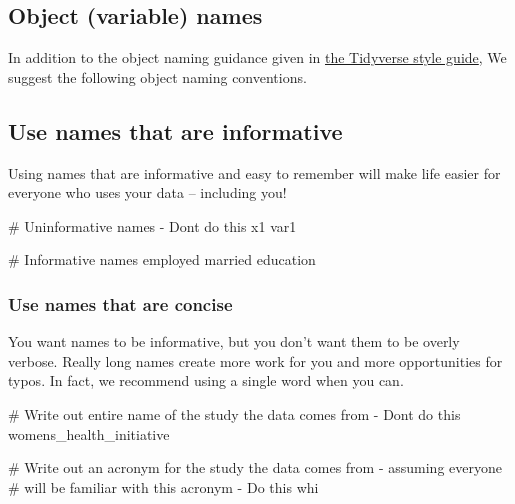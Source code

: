 \documentclass[
  letterpaper,
  DIV=11,
  numbers=noendperiod]{scrreprt}
\newenvironment{Shaded}{\begin{snugshade}}{\end{snugshade}}
\newcommand{\CommentTok}[1]{\textcolor[rgb]{0.37,0.37,0.37}{#1}}
\newcommand{\NormalTok}[1]{\textcolor[rgb]{0.00,0.23,0.31}{#1}}
\begin{document}
\subsection{Object (variable) names}\label{object-variable-names}

In addition to the object naming guidance given in
\href{https://style.tidyverse.org/files.html\#names}{the Tidyverse style
guide}, We suggest the following object naming conventions.

\subsection{Use names that are
informative}\label{use-names-that-are-informative}

Using names that are informative and easy to remember will make life
easier for everyone who uses your data -- including you!

\begin{Shaded}
\begin{Highlighting}[]
\CommentTok{\# Uninformative names {-} Don\textquotesingle{}t do this}
\NormalTok{x1}
\NormalTok{var1}

\CommentTok{\# Informative names}
\NormalTok{employed}
\NormalTok{married}
\NormalTok{education}
\end{Highlighting}
\end{Shaded}

\subsubsection{Use names that are
concise}\label{use-names-that-are-concise}

You want names to be informative, but you don't want them to be overly
verbose. Really long names create more work for you and more
opportunities for typos. In fact, we recommend using a single word when
you can.

\begin{Shaded}
\begin{Highlighting}[]
\CommentTok{\# Write out entire name of the study the data comes from {-} Don\textquotesingle{}t do this}
\NormalTok{womens\_health\_initiative}

\CommentTok{\# Write out an acronym for the study the data comes from {-} assuming everyone }
\CommentTok{\# will be familiar with this acronym {-} Do this}
\NormalTok{whi}
\end{Highlighting}
\end{Shaded}
\end{document}
